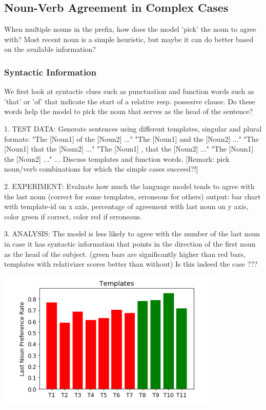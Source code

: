\begin{multicols}{2}
 
\subsection{Noun-Verb Agreement in Complex Cases}

When multiple nouns in the prefix, how does the model 'pick' the noun to agree with?
Most recent noun is a simple heuristic, but maybe it can do better based
on the available information?

\subsubsection{Syntactic Information}

We first look at syntactic clues such as punctuation
and function words such as 'that' or 'of'
that indicate the start of a relative resp. possesive
clause. Do these words help the model to pick
the noun that serves as the head of the sentence?

1. TEST DATA:
Generate sentences using different templates, singular and plural formats:
"The [Noun1] of the [Noun2] ..."
"The [Noun1] and the [Noun2] ..."
"The [Noun1] that the [Noun2] ..."
"The [Noun1] , that the [Noun2] ..."
"The [Noun1] the [Noun2] ..."
...
Discuss templates and function words.
[Remark: pick noun/verb combinations for which the simple cases succeed?!]

2. EXPERIMENT:
Evaluate how much the language model tends to agree with the last noun 
(correct for some templates, erroneous for others)
output: bar chart with template-id on x axis, percentage of agreement
with last noun on y axis, color green if correct, color red if erroneous.  

3. ANALYSIS:
The model is less likely to agree with the number of the 
last noun in case it has syntactic information
that points in the direction of the first noun as the head of the subject.
(green bars are significantly higher than red bars,
templates with relativizer scores better than without)
Is this indeed the case ???

\includegraphics[scale=0.5]{screenshot-syntactic-templates} 
 

\end{multicols}
